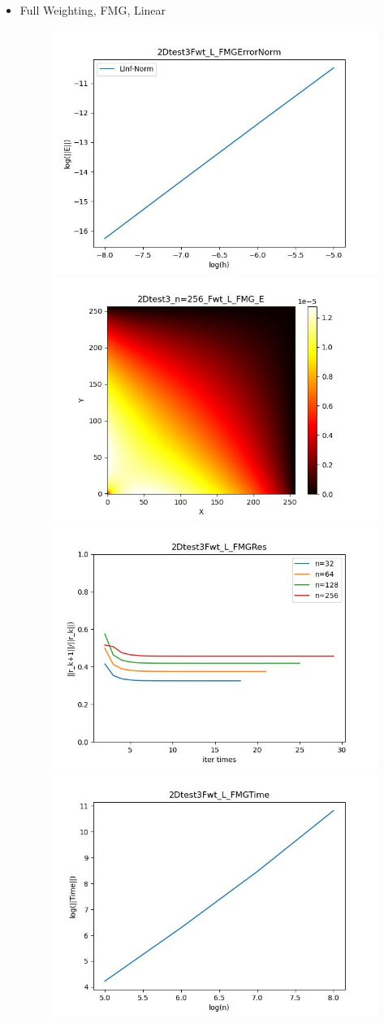 \documentclass{article}
\begin{document}
\begin{itemize}
    \item Full Weighting, FMG, Linear
    \begin{figure}[h]
        \centering
        \includegraphics[width=0.35\linewidth]{2Dtest3Fwt_L_FMGErrorNorm.jpg}
        \includegraphics[width=0.35\linewidth]{2Dtest3_n=256_Fwt_L_FMG_E.jpg}
        \includegraphics[width=0.35\linewidth]{2Dtest3Fwt_L_FMGRes.jpg}
        \includegraphics[width=0.35\linewidth]{2Dtest3Fwt_L_FMGTime.jpg}
    \end{figure}
    

\end{itemize}
\end{document}
